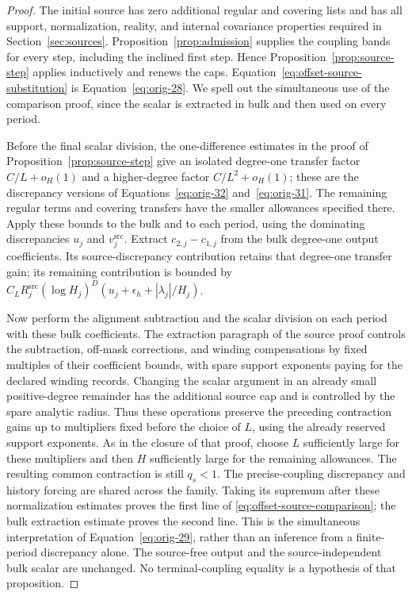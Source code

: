 \begin{proof}
The initial source has zero additional regular and covering lists and
has all support, normalization, reality, and internal covariance
properties required in Section~\ref{sec:sources}.
Proposition~\ref{prop:admission} supplies the coupling bands for every
step, including the inclined first step.  Hence
Proposition~\ref{prop:source-step} applies inductively and renews the
caps.  Equation~\eqref{eq:offset-source-substitution} is
Equation~\eqref{eq:orig-28}.  We spell out the simultaneous use of
the comparison proof, since the scalar is extracted in bulk and then
used on every period.

Before the final scalar division, the one-difference estimates in
the proof of Proposition~\ref{prop:source-step} give an isolated
degree-one transfer factor $C/L+o_H(1)$ and a higher-degree factor
$C/L^2+o_H(1)$; these are the discrepancy versions of
Equations~\eqref{eq:orig-32} and~\eqref{eq:orig-31}.
The remaining regular terms and covering transfers have the smaller
allowances specified there.  Apply these bounds to the bulk and to
each period, using the dominating discrepancies $u_j$ and
$v_j^{\mathrm{src}}$.  Extract $c_{2,j}-c_{1,j}$ from the bulk
degree-one output coefficients.  Its source-discrepancy contribution
retains that degree-one transfer gain; its remaining contribution is
bounded by
$C_LR_j^{\mathrm{src}}(\log H_j)^D
(u_j+\epsilon_h+|\lambda_j|/H_j)$.

Now perform the alignment subtraction and the scalar division on
each period with these bulk coefficients.  The extraction paragraph
of the source proof controls the subtraction, off-mask corrections,
and winding compensations by fixed multiples of their coefficient
bounds, with spare support exponents paying for the declared winding
records.  Changing the scalar argument in an already small
positive-degree remainder has the additional source cap and is
controlled by the spare analytic radius.  Thus these operations
preserve the preceding contraction gains up to multipliers fixed
before the choice of $L$, using the already reserved support exponents.
As in the closure of that proof, choose $L$ sufficiently large for
these multipliers and then $H$ sufficiently large for the remaining
allowances.  The resulting common contraction is still $q_s<1$.
The precise-coupling discrepancy and history forcing are shared
across the family.  Taking its supremum after these normalization
estimates proves the first line of
\eqref{eq:offset-source-comparison}; the bulk extraction estimate
proves the second line.  This is the simultaneous interpretation of
Equation~\eqref{eq:orig-29}, rather than an inference from a
finite-period discrepancy alone.
The source-free output and the source-independent bulk scalar are
unchanged.  No terminal-coupling equality is a hypothesis of that
proposition.
\end{proof}

